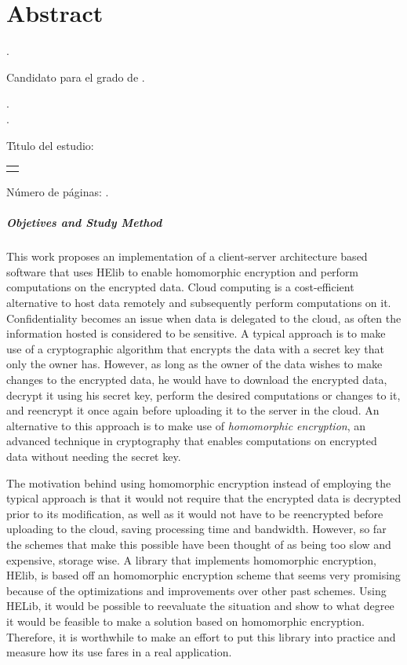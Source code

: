 \chapter{Abstract}

\noindent\autor.

\noindent Candidato para el grado de \grado.

\noindent\uanl.\\
\noindent\fime.

\noindent T\'{\i}tulo del estudio: 

\begin{center}
\begin{tabular}{p{11cm}}
	\centering
	\scshape{\large{\titulo}}
\end{tabular}
\end{center}\bigskip

\noindent N\'{u}mero de p\'{a}ginas: \pageref{LastPage}.

\paragraph{Objetives and Study Method}
This work proposes an implementation of a client-server architecture based software that uses HElib to enable homomorphic encryption and perform computations on the encrypted data. Cloud computing is a cost-efficient alternative to host data remotely and subsequently perform computations on it. Confidentiality becomes an issue when data is delegated to the cloud, as often the information hosted is considered to be sensitive. A typical approach is to make use of a cryptographic algorithm that encrypts the data with a secret key that only the owner has. However, as long as the owner of the data wishes to make changes to the encrypted data, he would have to download the encrypted data, decrypt it using his secret key, perform the desired computations or changes to it, and reencrypt it once again before uploading it to the server in the cloud. An alternative to this approach is to make use of \emph{homomorphic encryption}, an advanced technique in cryptography that enables computations on encrypted data without needing the secret key. 

The motivation behind using homomorphic encryption instead of employing the typical approach is that it would not require that the encrypted data is decrypted prior to its modification, as well as it would not have to be reencrypted before uploading to the cloud, saving processing time and bandwidth. However, so far the schemes that make this possible have been thought of as being too slow and expensive, storage wise. A library that implements homomorphic encryption, HElib, is based off an homomorphic encryption scheme that seems very promising because of the optimizations and improvements over other past schemes. Using HELib, it would be possible to reevaluate the situation and show to what degree it would be feasible to make a solution based on homomorphic encryption. Therefore, it is worthwhile to make an effort to put this library into practice and measure how its use fares in a real application.

